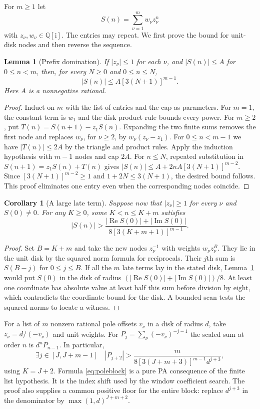 \documentclass[11pt]{amsart}
\newtheorem{lemma}[theorem]{Lemma}
\newtheorem{corollary}[theorem]{Corollary}
\theoremstyle{definition}
\theoremstyle{remark}
\numberwithin{equation}{section}
\newcommand{\QQi}{\mathbb Q[\mathrm i]}
\newcommand{\re}{\operatorname{Re}}
\newcommand{\im}{\operatorname{Im}}
\begin{document}
For $m\ge1$ let
\[
 S(n)=\sum_{\nu=1}^m w_\nu z_\nu^n
\]
with $z_\nu,w_\nu\in\QQi$. The entries may repeat. We first prove
the bound for unit-disk nodes and then reverse the sequence.
\begin{lemma}[Prefix domination]\label{lem:prefix}
If $|z_\nu|\le1$ for each $\nu$, and $|S(n)|\le A$ for
$0\le n<m$, then, for every $N\ge0$ and $0\le n\le N$,
\[
 |S(n)|\le A[3(N+1)]^{m-1}.
\]
Here $A$ is a nonnegative rational.
\end{lemma}
\begin{proof}
Induct on $m$ with the list of entries and the cap as parameters.
For $m=1$, the constant term is $w_1$ and the disk product rule
bounds every power. For $m\ge2$, put
$T(n)=S(n+1)-z_1S(n)$. Expanding the two finite sums removes
the first node and replaces $w_\nu$, for $\nu\ge2$, by
$w_\nu(z_\nu-z_1)$. For $0\le n<m-1$ we have $|T(n)|\le2A$
by the triangle and product rules. Apply the induction hypothesis
with $m-1$ nodes and cap $2A$. For $n\le N$, repeated substitution
in $S(n+1)=z_1S(n)+T(n)$ gives
$|S(n)|\le A+2nA[3(N+1)]^{m-2}$.
Since $[3(N+1)]^{m-2}\ge1$ and $1+2N\le3(N+1)$,
the desired bound follows. This proof eliminates one entry even
when the corresponding nodes coincide.
\end{proof}

\begin{corollary}[A large late term]\label{cor:late}
Suppose now that $|z_\nu|\ge1$ for every $\nu$ and $S(0)\ne0$.
For any $K\ge0$, some $K<n\le K+m$ satisfies
\[
 |S(n)|>\frac{|\re S(0)|+|\im S(0)|}
                {8[3(K+m+1)]^{m-1}} .
\]
\end{corollary}
\begin{proof}
Set $B=K+m$ and take the new nodes $z_\nu^{-1}$ with
weights $w_\nu z_\nu^B$. They lie in the unit disk by the
squared norm formula for reciprocals. Their $j$th sum is
$S(B-j)$ for $0\le j\le B$. If all the $m$ late terms lay
in the stated disk, Lemma~\ref{lem:prefix} would put $S(0)$
in the disk of radius $(|\re S(0)|+|\im S(0)|)/8$.
At least one coordinate has absolute value at least half this
sum before division by eight, which contradicts the coordinate
bound for the disk. A bounded scan tests the squared norms
to locate a witness.
\end{proof}

For a list of $m$ nonzero rational pole offsets $v_\nu$ in a disk
of radius $d$, take $z_\nu=d/(-v_\nu)$ and unit weights.
For $P_j=\sum_\nu(-v_\nu)^{-j-1}$ the scaled sum at order $n$
is $d^nP_{n-1}$. In particular,
\begin{equation}\label{eq:poleblock}
 \exists j\in[J,J+m-1]\quad
 |P_{j+2}|>
 \frac{m}{8[3(J+m+3)]^{m-1}d^{j+3}},
\end{equation}
using $K=J+2$. Formula \eqref{eq:poleblock} is a pure PA
consequence of the finite list hypothesis. It is the
index shift used by the window coefficient search. The proof
also supplies a common positive floor for the entire block:
replace $d^{j+3}$ in the denominator by
$\max(1,d)^{J+m+2}$.
\end{document}
